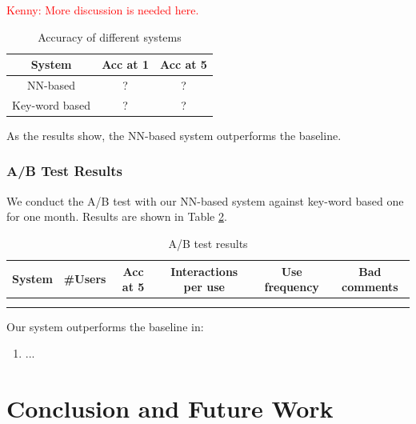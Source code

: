 \documentclass[a4paper,10pt]{article}
\newcommand{\KZ}[1]{\textcolor{red}{Kenny: #1}}
\begin{document}
\KZ{More discussion is needed here.}

\begin{table}[]
    \centering
    \begin{tabular}{c|c|c}
         \toprule[1pt]
         System & Acc at 1 & Acc at 5  \\ \hline
         NN-based & ? & ? \\ \hline
         Key-word based & ? & ? \\
         \bottomrule[1pt]
    \end{tabular}
    \caption{Accuracy of different systems}
    \label{static}
\end{table}
\par As the results show, the NN-based system outperforms the baseline.

\subsubsection{A/B Test Results}
\par We conduct the A/B test with our NN-based system against key-word based one for one month. Results are shown in Table \ref{abtest}.
\begin{table}[]
    \centering
    \begin{tabular}{c|c|c|c|c|c}
         \toprule[1pt]
         System&\#Users&Acc at 5&Interactions per use&Use frequency&Bad comments  \\ \hline
         & & & & & \\ \hline
         & & & & & \\
         \bottomrule[1pt]
    \end{tabular}
    \caption{A/B test results}
    \label{abtest}
\end{table}
\par Our system outperforms the baseline in:
\begin{enumerate}
    \item ...
\end{enumerate}

\section{Conclusion and Future Work}


\medskip


\end{document}
